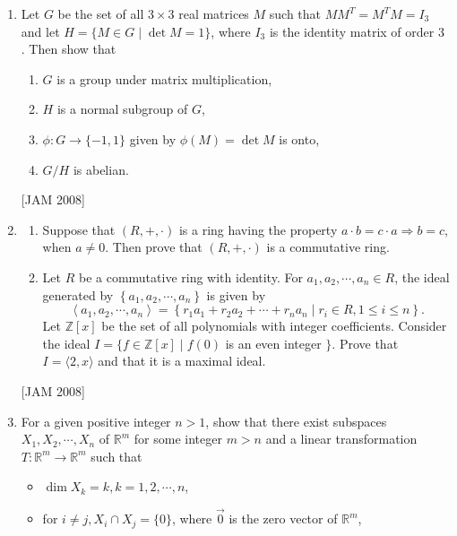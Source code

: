 \begin{enumerate}
\item  Let $G$ be the set of all $3 \times 3$ real matrices $M$ such that $M M^{T}=M^{T} M=I_{3}$ and let $H=\{M \in G \mid \operatorname{det} M=1\}$, where $I_{3}$ is the identity matrix of order 3 . Then show that
\begin{enumerate}
\item  $G$ is a group under matrix multiplication,

\item  $H$ is a normal subgroup of $G$,

\item  $\phi: G \rightarrow\{-1,1\}$ given by $\phi(M)=\operatorname{det} M$ is onto,

\item $G / H$ is abelian.
\end{enumerate}
 \hfill [JAM 2008]


\item 
\begin{enumerate}
\item Suppose that $(R,+, \cdot)$ is a ring having the property $a \cdot b=c \cdot a \Rightarrow b=c$, when $a \neq 0$. Then prove that $(R,+, \cdot)$ is a commutative ring.

\item  Let $R$ be a commutative ring with identity. For $a_{1}, a_{2}, \cdots, a_{n} \in R$, the ideal generated by $\left\{a_{1}, a_{2}, \cdots, a_{n}\right\}$ is given by
$$
\left\langle a_{1}, a_{2}, \cdots, a_{n}\right\rangle=\left\{r_{1} a_{1}+r_{2} a_{2}+\cdots+r_{n} a_{n} \mid r_{i} \in R, 1 \leq i \leq n\right\} .
$$
Let $\mathbb{Z}[x]$ be the set of all polynomials with integer coefficients. Consider the ideal $I=\{f \in \mathbb{Z}[x] \mid f(0)$ is an even integer $\}$. Prove that $I=\langle 2, x\rangle$ and that it is a maximal ideal.
\end{enumerate}
 \hfill [JAM 2008]




\item  For a given positive integer $n>1$, show that there exist subspaces $X_{1}, X_{2}, \cdots, X_{n}$ of $\mathbb{R}^{m}$ for some integer $m>n$ and a linear transformation $T: \mathbb{R}^{m} \rightarrow \mathbb{R}^{m}$ such that

\begin{itemize}
  \item $\operatorname{dim} X_{k}=k, k=1,2, \cdots, n$,

  \item for $i \neq j, X_{i} \cap X_{j}=\{0\}$, where $\overrightarrow{0}$ is the zero vector of $\mathbb{R}^{m}$,


\end{itemize}
\end{enumerate}
